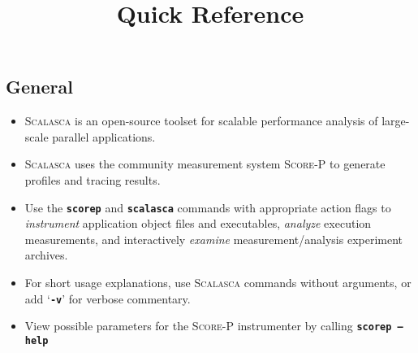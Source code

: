 \documentclass[a4paper]{article}
\title{\Scalasca \Version Quick Reference}
\newcommand{\Scalasca}{\textsc{Scalasca}\xspace}
\newcommand{\Scorep}{\textsc{Score-P}\xspace}
\begin{document}

\subsection*{General}

\begin{itemize}
  \item \Scalasca is an open-source toolset for scalable performance analysis of
        large-scale parallel applications.
  \item \Scalasca uses the community measurement system \Scorep to generate profiles and
        tracing results.
  \item Use the \textbf{\texttt{scorep}}  and \textbf{\texttt{scalasca}} commands with
        appropriate action flags to
        \textit{instrument\/} application object files and executables,
        \textit{analyze\/} execution measurements, and interactively
        \textit{examine\/} measurement/analysis experiment archives.
  \item For short usage explanations, use \Scalasca commands without arguments,
        or add `\textbf{\texttt{-v}}' for verbose commentary.
  \item View possible parameters for the \Scorep instrumenter by calling
        \textbf{\texttt{scorep --help}}
\end{itemize}

\end{document}
